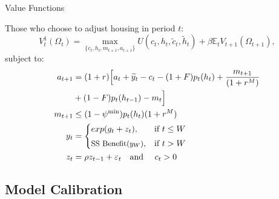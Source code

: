 \documentclass[10pt,english,t,10pt]{beamer}
\begin{document}
\begin{frame}{Value Functions}

Those who choose to adjust housing in period $t$:
\begin{equation}
V^1_t(\Omega_t)= \max_{\{c_t, h_t, m_{t+1}, a_{t+1}\}}
U(c_t, h_t, \tilde{c}_t,\tilde{h}_t) + \beta \mathbb{E}_tV_{t+1}(\Omega_{t+1}),
\label{V1}
\end{equation}
\hspace{53mm} subject to:
\begin{equation}
\begin{split}
a_{t+1} & = (1+r) \Big[a_t + \widetilde{y}_t  - c_t   -(1+F)p_t(h_t) + \frac{m_{t+1}}{(1+r^M)} \\ 
        & +(1-F)p_t(h_{t-1}) -m_t\Bigl] \\
m_{t+1} &\leq (1-\psi^{\min}) p_t(h_t) (1+r^M) \\
y_t     & =
\begin{cases}
exp(g_t  + z_{t}),  & \text{if } t\leq W \vspace{1mm} \\
\text{\small{SS Benefit($y_W$)}}  ,  & \text{if } t>W
\end{cases} \\
z_t & = \rho z_{t-1} + \varepsilon_t \quad \text{and } \quad c_t > 0\\
\end{split}
\label{BC_adj}
\end{equation}


\end{frame}


\subsection{Model Calibration}
\end{document}
